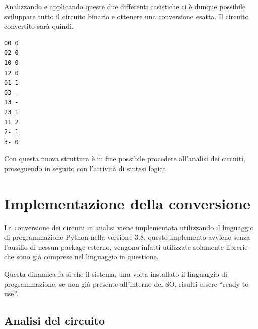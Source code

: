 \documentclass[
  italian,
]{book}
\begin{document}
\newpage

Analizzando e applicando queste due differenti casistiche ci è dunque possibile sviluppare tutto il circuito binario e ottenere una conversione esatta. Il circuito convertito sarà quindi.

\begin{verbatim}
00 0
02 0
10 0
12 0
01 1
03 -
13 -
23 1
11 2
2- 1
3- 0
\end{verbatim}

Con questa nuova struttura è in fine possibile procedere all'analisi dei circuiti, proseguendo in seguito con l'attività di sintesi logica.

\hypertarget{implementazione-della-conversione}{%
\section{Implementazione della conversione}\label{implementazione-della-conversione}}

La conversione dei circuiti in analisi viene implementata utilizzando il linguaggio di programmazione Python nella versione 3.8. questo implemento avviene senza l'ausilio di nessun package esterno, vengono infatti utilizzate solamente librerie che sono già comprese nel linguaggio in questione.

Questa dinamica fa si che il sistema, una volta installato il linguaggio di programmazione, se non già presente all'interno del SO, risulti essere ``ready to use''.

\newpage

\hypertarget{analisi-del-circuito}{%
\subsection{Analisi del circuito}\label{analisi-del-circuito}}
\end{document}
